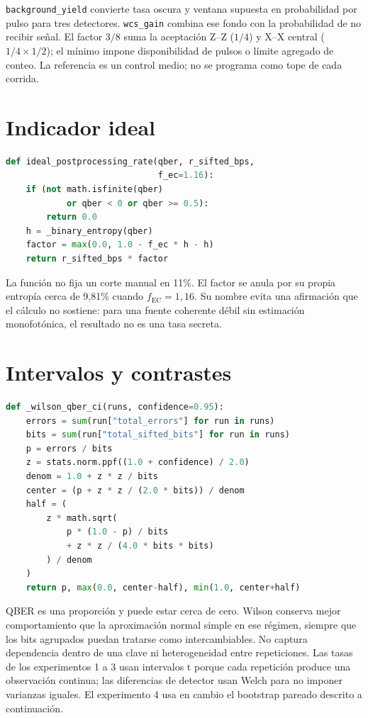 \texttt{background\_yield} convierte tasa oscura y ventana supuesta en probabilidad por pulso para tres detectores. \texttt{wcs\_gain} combina ese fondo con la probabilidad de no recibir señal. El factor \(3/8\) suma la aceptación Z--Z (\(1/4\)) y X--X central (\(1/4\times1/2\)); el mínimo impone disponibilidad de pulsos o límite agregado de conteo. La referencia es un control medio; no se programa como tope de cada corrida.

\section{Indicador ideal}

\begin{lstlisting}[language=Python, caption={Indicador de posprocesamiento monofotónico ideal.}]
def ideal_postprocessing_rate(qber, r_sifted_bps,
                              f_ec=1.16):
    if (not math.isfinite(qber)
            or qber < 0 or qber >= 0.5):
        return 0.0
    h = _binary_entropy(qber)
    factor = max(0.0, 1.0 - f_ec * h - h)
    return r_sifted_bps * factor
\end{lstlisting}

La función no fija un corte manual en 11\%. El factor se anula por su propia entropía cerca de 9,81\% cuando \(f_\mathrm{EC}=1{,}16\). Su nombre evita una afirmación que el cálculo no sostiene: para una fuente coherente débil sin estimación monofotónica, el resultado no es una tasa secreta.

\section{Intervalos y contrastes}

\begin{lstlisting}[language=Python, caption={Intervalo de Wilson para QBER agrupada.}]
def _wilson_qber_ci(runs, confidence=0.95):
    errors = sum(run["total_errors"] for run in runs)
    bits = sum(run["total_sifted_bits"] for run in runs)
    p = errors / bits
    z = stats.norm.ppf((1.0 + confidence) / 2.0)
    denom = 1.0 + z * z / bits
    center = (p + z * z / (2.0 * bits)) / denom
    half = (
        z * math.sqrt(
            p * (1.0 - p) / bits
            + z * z / (4.0 * bits * bits)
        ) / denom
    )
    return p, max(0.0, center-half), min(1.0, center+half)
\end{lstlisting}

QBER es una proporción y puede estar cerca de cero. Wilson conserva mejor comportamiento que la aproximación normal simple en ese régimen, siempre que los bits agrupados puedan tratarse como intercambiables. No captura dependencia dentro de una clave ni heterogeneidad entre repeticiones. Las tasas de los experimentos 1 a 3 usan intervalos t porque cada repetición produce una observación continua; las diferencias de detector usan Welch para no imponer varianzas iguales. El experimento 4 usa en cambio el bootstrap pareado descrito a continuación.

